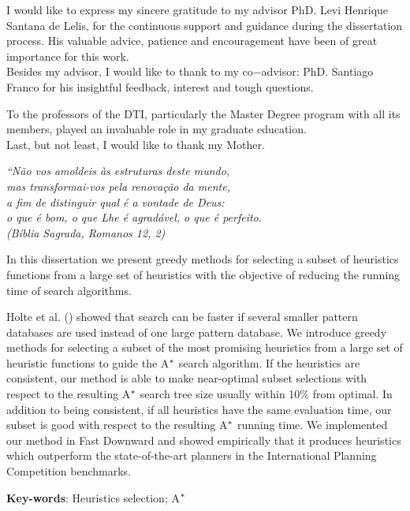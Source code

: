 \documentclass[
	12pt,				%
	openright,		nsubseteq	%
	twoside,			%
	a4paper,			%
	english,			%
	french,				%
	spanish,			%
	brazil				%
	]{abntex2}
\begin{document}
\begin{agradecimentos}
I would like to express my sincere gratitude to my advisor PhD. Levi Henrique Santana de Lelis, for the continuous support and guidance during the dissertation process. His valuable advice, patience and encouragement have been of great
importance for this work. \\

Besides my advisor, I would like to thank to my co$-$advisor: PhD. Santiago Franco for his insightful feedback, interest and tough questions.

To the professors of the DTI, particularly the Master Degree program with all its members, played an invaluable role in my graduate education. \\

Last, but not least, I would like to thank my Mother.
\end{agradecimentos}

\begin{epigrafe}
    \vspace*{\fill}
	\begin{flushright}
		\textit{``Não vos amoldeis às estruturas deste mundo, \\
		mas transformai-vos pela renovação da mente, \\
		a fim de distinguir qual é a vontade de Deus: \\
		o que é bom, o que Lhe é agradável, o que é perfeito.\\
		(Bíblia Sagrada, Romanos 12, 2)}
	\end{flushright}
\end{epigrafe}


\setlength{\absparsep}{18pt} %
\begin{resumo}
In this dissertation we present greedy methods for selecting a subset of heuristics functions from a large set of heuristics with the objective of reducing the running time of search algorithms.

Holte et al. (\citeyear{holte2006maximizing}) showed that search can be faster if several smaller pattern databases are used instead of one large pattern database. We introduce greedy methods for selecting a subset of the most promising heuristics from a large set of heuristic functions to guide the A$\sp{*}$ search algorithm. If the heuristics are consistent, our method is able to make near-optimal subset selections with respect to the resulting A$\sp{*}$ search tree size usually within 10\% from optimal. In addition to being consistent, if all heuristics have the same evaluation time, our subset is good with respect to the resulting A$\sp{*}$ running time. We implemented our method in Fast Downward and showed empirically that it produces heuristics which outperform the state-of-the-art planners in the International Planning Competition benchmarks.

 \textbf{Key-words}: Heuristics selection; A$\sp{*}$
\end{resumo}
\end{document}
